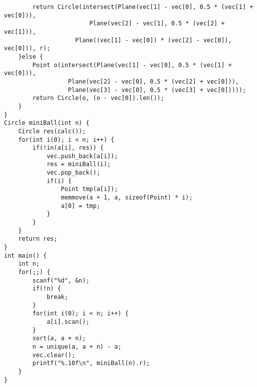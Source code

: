 \begin{lstlisting}
		return Circle(intersect(Plane(vec[1] - vec[0], 0.5 * (vec[1] + vec[0])),
				       	Plane(vec[2] - vec[1], 0.5 * (vec[2] + vec[1])),
					Plane((vec[1] - vec[0]) * (vec[2] - vec[0]), vec[0])), r);
	}else {
		Point o(intersect(Plane(vec[1] - vec[0], 0.5 * (vec[1] + vec[0])),
				  Plane(vec[2] - vec[0], 0.5 * (vec[2] + vec[0])),
				  Plane(vec[3] - vec[0], 0.5 * (vec[3] + vec[0]))));
		return Circle(o, (o - vec[0]).len());
	}
}
Circle miniBall(int n) {
	Circle res(calc());
	for(int i(0); i < n; i++) {
		if(!in(a[i], res)) {
			vec.push_back(a[i]);
			res = miniBall(i);
			vec.pop_back();
			if(i) {
				Point tmp(a[i]);
				memmove(a + 1, a, sizeof(Point) * i);
				a[0] = tmp;
			}
		}
	}
	return res;
}
int main() {
	int n;
	for(;;) {
		scanf("%d", &n);
		if(!n) {
			break;
		}
		for(int i(0); i < n; i++) {
			a[i].scan();
		}
		sort(a, a + n);
		n = unique(a, a + n) - a;
		vec.clear();
		printf("%.10f\n", miniBall(n).r);
	}
}
\end{lstlisting}
